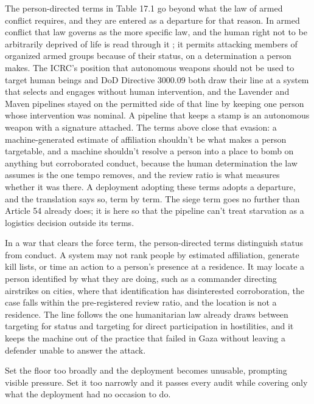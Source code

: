 The person-directed terms in Table 17.1 go beyond what the law of armed conflict requires, and they are entered as a departure for that reason. In armed conflict that law governs as the more specific law, and the human right not to be arbitrarily deprived of life is read through it \autocite[para.~25]{icj1996nuclear}; it permits attacking members of organized armed groups because of their status, on a determination a person makes. The ICRC's position that autonomous weapons should not be used to target human beings \autocite{icrc2021aws} and DoD Directive 3000.09 both draw their line at a system that selects and engages without human intervention, and the Lavender and Maven pipelines stayed on the permitted side of that line by keeping one person whose intervention was nominal. A pipeline that keeps a stamp is an autonomous weapon with a signature attached. The terms above close that evasion: a machine-generated estimate of affiliation shouldn't be what makes a person targetable, and a machine shouldn't resolve a person into a place to bomb on anything but corroborated conduct, because the human determination the law assumes is the one tempo removes, and the review ratio is what measures whether it was there. A deployment adopting these terms adopts a departure, and the translation says so, term by term. The siege term goes no further than Article 54 already does; it is here so that the pipeline can't treat starvation as a logistics decision outside its terms.

In a war that clears the force term, the person-directed terms distinguish status from conduct. A system may not rank people by estimated affiliation, generate kill lists, or time an action to a person's presence at a residence. It may locate a person identified by what they are doing, such as a commander directing airstrikes on cities, where that identification has disinterested corroboration, the case falls within the pre-registered review ratio, and the location is not a residence. The line follows the one humanitarian law already draws between targeting for status and targeting for direct participation in hostilities, and it keeps the machine out of the practice that failed in Gaza without leaving a defender unable to answer the attack.


Set the floor too broadly and the deployment becomes unusable, prompting visible pressure. Set it too narrowly and it passes every audit while covering only what the deployment had no occasion to do.

